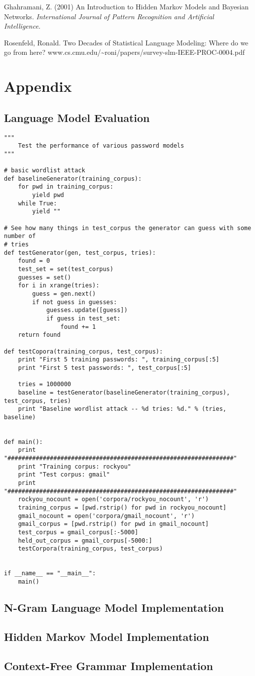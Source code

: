 \documentclass{amsart}
\theoremstyle{definition}
\theoremstyle{remark}
\numberwithin{equation}{section}
\begin{document}
\newpage

\begin{thebibliography}{9}
Ghahramani, Z. (2001) An Introduction to Hidden Markov Models and Bayesian Networks.
\textit{International Journal of Pattern Recognition and Artificial Intelligence.}

Rosenfeld, Ronald. Two Decades of Statistical Language Modeling: Where do we go from here?
www.cs.cmu.edu/\textasciitilde{}roni/papers/survey-slm-IEEE-PROC-0004.pdf

\end{thebibliography}

\newpage

\section{Appendix}
\subsection{Language Model Evaluation}
\begin{lstlisting}
"""
    Test the performance of various password models
"""

# basic wordlist attack
def baselineGenerator(training_corpus):
    for pwd in training_corpus:
        yield pwd
    while True:
        yield ""

# See how many things in test_corpus the generator can guess with some number of
# tries
def testGenerator(gen, test_corpus, tries):
    found = 0
    test_set = set(test_corpus)
    guesses = set()
    for i in xrange(tries):
        guess = gen.next()
        if not guess in guesses:
            guesses.update([guess])
            if guess in test_set:
                found += 1
    return found

def testCopora(training_corpus, test_corpus):
    print "First 5 training passwords: ", training_corpus[:5]
    print "First 5 test passwords: ", test_corpus[:5]

    tries = 1000000
    baseline = testGenerator(baselineGenerator(training_corpus), test_corpus, tries)
    print "Baseline wordlist attack -- %d tries: %d." % (tries, baseline)
 

def main():
    print "################################################################"
    print "Training corpus: rockyou"
    print "Test corpus: gmail"
    print "################################################################"
    rockyou_nocount = open('corpora/rockyou_nocount', 'r')
    training_corpus = [pwd.rstrip() for pwd in rockyou_nocount]
    gmail_nocount = open('corpora/gmail_nocount', 'r')
    gmail_corpus = [pwd.rstrip() for pwd in gmail_nocount]
    test_corpus = gmail_corpus[:-5000]
    held_out_corpus = gmail_corpus[-5000:]
    testCorpora(training_corpus, test_corpus)


if __name__ == "__main__":
    main()
\end{lstlisting}
\subsection{N-Gram Language Model Implementation}
\subsection{Hidden Markov Model Implementation}
\subsection{Context-Free Grammar Implementation}
\end{document}
